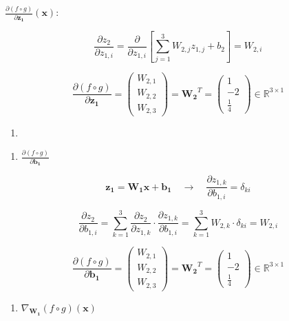 \documentclass[
  letterpaper,
  DIV=11,
  numbers=noendperiod]{scrartcl}
\providecommand{\tightlist}{%
  \setlength{\itemsep}{0pt}\setlength{\parskip}{0pt}}\usepackage{longtable,booktabs,array}
\begin{document}
\(\frac{\partial(f \circ g)}{\partial \mathbf{z_1}}(\mathbf{x})\):

\[\frac{\partial z_2}{\partial z_{1,i}} = \frac{\partial}{\partial z_{1,i}}\left[\sum_{j=1}^3 W_{2,j}z_{1,j} + b_2\right] = W_{2,i}\]

\[\frac{\partial(f \circ g)}{\partial \mathbf{z_1}} = \begin{pmatrix}W_{2,1}\\W_{2,2}\\W_{2,3}\end{pmatrix} = \mathbf{W_2}^T = \begin{pmatrix}1\\-2\\\frac{1}{4}\end{pmatrix} \in \mathbb{R}^{3 \times 1}\]

\begin{enumerate}
\def\labelenumi{\arabic{enumi}.}
\setcounter{enumi}{6}
\tightlist
\item
\end{enumerate}

\begin{enumerate}
\def\labelenumi{(\alph{enumi})}
\tightlist
\item
  \(\frac{\partial(f \circ g)}{\partial \mathbf{b_1}}\)
\end{enumerate}

\[\mathbf{z_1} = \mathbf{W_1}\mathbf{x} + \mathbf{b_1} \quad \rightarrow \quad \frac{\partial z_{1,k}}{\partial b_{1,i}} = \delta_{ki}\]

\[\frac{\partial z_2}{\partial b_{1,i}} = \sum_{k=1}^3 \frac{\partial z_2}{\partial z_{1,k}} \cdot \frac{\partial z_{1,k}}{\partial b_{1,i}} = \sum_{k=1}^3 W_{2,k} \cdot \delta_{ki} = W_{2,i}\]

\[\frac{\partial(f \circ g)}{\partial \mathbf{b_1}} = \begin{pmatrix}W_{2,1}\\W_{2,2}\\W_{2,3}\end{pmatrix} = \mathbf{W_2}^T = \begin{pmatrix}1\\-2\\\frac{1}{4}\end{pmatrix} \in \mathbb{R}^{3 \times 1}\]

\begin{enumerate}
\def\labelenumi{(\alph{enumi})}
\setcounter{enumi}{1}
\tightlist
\item
  \(\nabla_{\mathbf{W_1}}(f \circ g)(\mathbf{x})\)
\end{enumerate}
\end{document}
